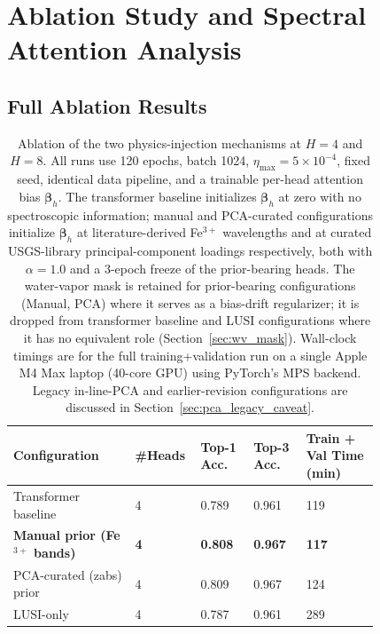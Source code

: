\documentclass[11pt]{report}
\begin{document}
\chapter{Ablation Study and Spectral Attention Analysis}
\label{chap:ablation}

\section{Full Ablation Results}

\begin{table}[!htbp]
\centering
\small
\caption{Ablation of the two physics-injection mechanisms at $H = 4$ and $H = 8$. All runs use 120 epochs, batch 1024, $\eta_{\max} = 5 \times 10^{-4}$, fixed seed, identical data pipeline, and a trainable per-head attention bias $\bm{\beta}_h$. The transformer baseline initializes $\bm{\beta}_h$ at zero with no spectroscopic information; manual and PCA-curated configurations initialize $\bm{\beta}_h$ at literature-derived Fe$^{3+}$ wavelengths and at curated USGS-library principal-component loadings respectively, both with $\alpha = 1.0$ and a 3-epoch freeze of the prior-bearing heads. The water-vapor mask is retained for prior-bearing configurations (Manual, PCA) where it serves as a bias-drift regularizer; it is dropped from transformer baseline and LUSI configurations where it has no equivalent role (Section~\ref{sec:wv_mask}). Wall-clock timings are for the full training+validation run on a single Apple M4 Max laptop (40-core GPU) using PyTorch's MPS backend. Legacy in-line-PCA and earlier-revision configurations are discussed in Section~\ref{sec:pca_legacy_caveat}.}
\label{tab:ablation}
\begin{tabular}{p{0.30\linewidth}p{0.08\linewidth}p{0.13\linewidth}p{0.13\linewidth}p{0.18\linewidth}}
\hline
\rowcolor[gray]{0.85}
\textbf{Configuration} & \textbf{\#Heads} & \textbf{Top-1 Acc.} & \textbf{Top-3 Acc.} & \textbf{Train + Val Time (min)} \\
\hline
Transformer baseline & 4 & 0.789 & 0.961 & 119 \\
\hline
\textbf{Manual prior (Fe$^{3+}$ bands)} & \textbf{4} & \textbf{0.808} & \textbf{0.967} & \textbf{117} \\
\hline
PCA-curated (zabs) prior & 4 & 0.809 & 0.967 & 124 \\
\hline
LUSI-only & 4 & 0.787 & 0.961 & 289 \\

\end{tabular}
\end{table}
\end{document}
